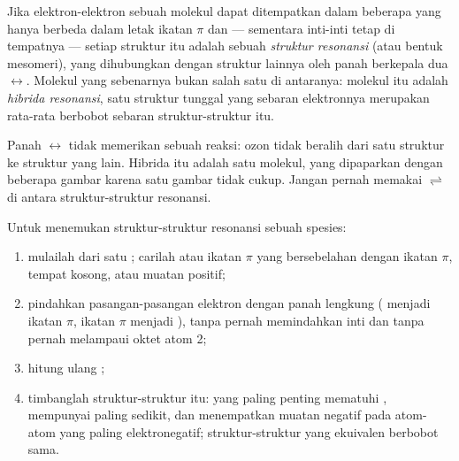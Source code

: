 \begin{definition}\label{def:b1:lewis-resonance-vsepr:resonance}
Jika elektron-elektron sebuah molekul dapat ditempatkan dalam beberapa
 yang hanya berbeda dalam letak ikatan $\pi$ dan  --- sementara inti-inti tetap di tempatnya --- setiap
struktur itu adalah sebuah
\emph{struktur resonansi} (atau bentuk mesomeri), yang dihubungkan dengan struktur
lainnya oleh panah berkepala dua $\leftrightarrow$. Molekul yang
sebenarnya bukan salah satu di antaranya: molekul itu adalah
\emph{hibrida resonansi}, satu struktur tunggal
yang sebaran elektronnya merupakan rata-rata berbobot sebaran
struktur-struktur itu.
\end{definition}

\begin{remark}\label{rem:b1:lewis-resonance-vsepr:arrow}
Panah $\leftrightarrow$ tidak memerikan sebuah reaksi: ozon tidak beralih
dari satu struktur ke struktur yang lain. Hibrida itu adalah satu
molekul, yang dipaparkan dengan beberapa gambar karena satu gambar tidak
cukup. Jangan pernah memakai $\rightleftharpoons$ di antara
struktur-struktur resonansi.
\end{remark}

\begin{method}\label{met:b1:lewis-resonance-vsepr:resonance}
Untuk menemukan struktur-struktur resonansi sebuah spesies:
\begin{enumerate}
  \item mulailah dari satu ; carilah  atau ikatan $\pi$ yang bersebelahan dengan ikatan $\pi$,
        tempat kosong, atau muatan positif;
  \item pindahkan pasangan-pasangan elektron dengan panah lengkung
        ( menjadi ikatan $\pi$, ikatan $\pi$ menjadi
        ), tanpa pernah memindahkan inti dan tanpa pernah
        melampaui oktet atom  2;
  \item hitung ulang ;
  \item timbanglah struktur-struktur itu: yang paling penting mematuhi
        , mempunyai  paling sedikit, dan
        menempatkan muatan negatif pada atom-atom yang paling
        elektronegatif; struktur-struktur yang ekuivalen berbobot sama.
\end{enumerate}
\end{method}

